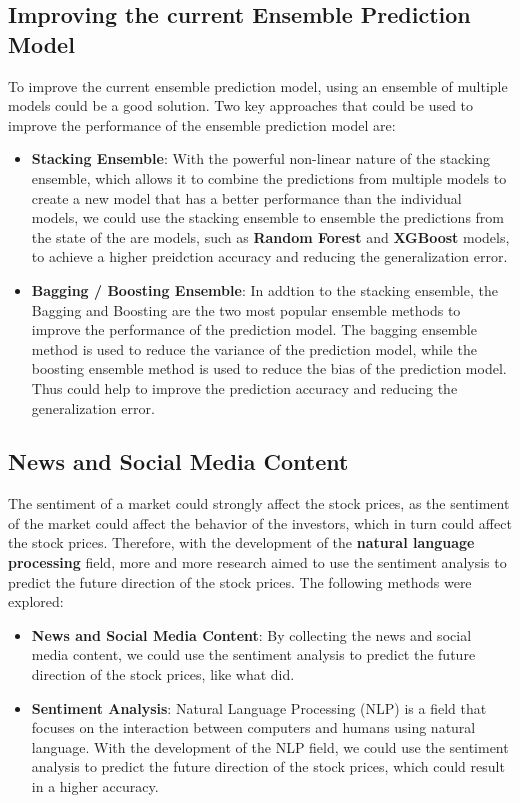 \documentclass[11pt]{article}
\begin{document}
\subsection{Improving the current Ensemble Prediction Model}
To improve the current ensemble prediction model, using an ensemble of multiple models could be a good solution. Two key
approaches that could be used to improve the performance of the ensemble prediction model are:
\begin{itemize}
    \item \textbf{Stacking Ensemble}: With the powerful non-linear nature of the stacking ensemble, which allows it to
    combine the predictions from multiple models to create a new model that has a better performance than the individual models,
    we could use the stacking ensemble to ensemble the predictions from the state of the are
    models, such as \textbf{Random Forest} and \textbf{XGBoost} models, to achieve a higher preidction accuracy and reducing the
    generalization error. \cite{Jiang2020-xl}
    \item \textbf{Bagging / Boosting Ensemble}: In addtion to the stacking ensemble, the Bagging and Boosting are the two most popular
    ensemble methods to improve the performance of the prediction model. The bagging ensemble method is used to reduce the variance of the prediction model,
    while the boosting ensemble method is used to reduce the bias of the prediction model. Thus could help to improve the prediction accuracy and reducing the
    generalization error. \cite{Jiang2020-xl}
\end{itemize}

\subsection{News and Social Media Content}
The sentiment of a market could strongly affect the stock prices, as the sentiment of the market could affect the behavior of the investors,
which in turn could affect the stock prices. Therefore, with the development of the \textbf{natural language processing} field, more and more
research aimed to use the sentiment analysis to predict the future direction of the stock prices. The following methods were explored:
\begin{itemize}
    \item \textbf{News and Social Media Content}: By collecting the news and social media content, we could use the sentiment analysis to predict the future direction of the stock prices, like what \cite{Bharathi2018-qx} did.
    \item \textbf{Sentiment Analysis}: Natural Language Processing (NLP) is a field that focuses on the interaction between computers and humans using natural language. With the development of the NLP field,
    we could use the sentiment analysis to predict the future direction of the stock prices, which could result in a higher accuracy. \cite{Bharathi2018-qx}
\end{itemize}
\end{document}
